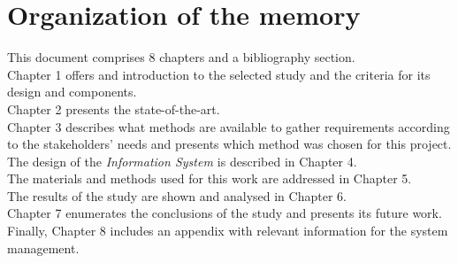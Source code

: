 


\section{Organization of the memory}

This document comprises 8 chapters and a bibliography section.\\

Chapter 1 offers and introduction to the selected study and the criteria for its design and components.\\

Chapter 2 presents the state-of-the-art.\\

Chapter 3 describes what methods are available to gather requirements according to the stakeholders' needs and presents which method was chosen for this project.\\

The design of the \textit{Information System \cite{noauthor_chapter_nodate, noauthor_information_2017}} is described in Chapter 4.\\

The materials and methods used for this work are addressed in Chapter 5.\\

The results of the study are shown and analysed in Chapter 6.\\

Chapter 7 enumerates the conclusions of the study and presents its future work.\\

Finally, Chapter 8 includes an appendix with relevant information for the system management.  


